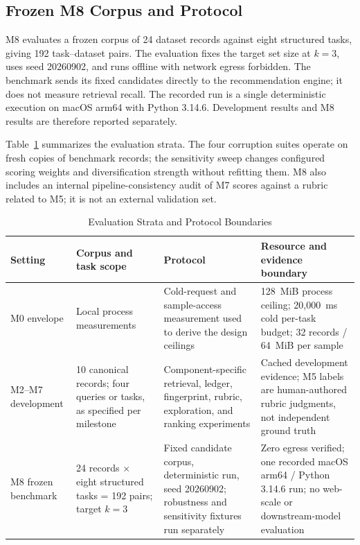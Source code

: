 \documentclass[conference]{IEEEtran}
\begin{document}
\subsection{Frozen M8 Corpus and Protocol}
M8 evaluates a frozen corpus of 24 dataset records against eight structured tasks, giving 192 task--dataset pairs. The evaluation fixes the target set size at $k=3$, uses seed 20260902, and runs offline with network egress forbidden. The benchmark sends its fixed candidates directly to the recommendation engine; it does not measure retrieval recall. The recorded run is a single deterministic execution on macOS arm64 with Python 3.14.6. Development results and M8 results are therefore reported separately.

Table~\ref{tab:eval-protocol} summarizes the evaluation strata. The four corruption suites operate on fresh copies of benchmark records; the sensitivity sweep changes configured scoring weights and diversification strength without refitting them. M8 also includes an internal pipeline-consistency audit of M7 scores against a rubric related to M5; it is not an external validation set.

\begin{table}[t]
\caption{Evaluation Strata and Protocol Boundaries}
\label{tab:eval-protocol}
\centering
\footnotesize
\begin{tabularx}{\textwidth}{p{0.78in}p{1.35in}X p{1.70in}}
\toprule
Setting & Corpus and task scope & Protocol & Resource and evidence boundary \\
\midrule
M0 envelope & Local process measurements & Cold-request and sample-access measurement used to derive the design ceilings & 128~MiB process ceiling; 20{,}000~ms cold per-task budget; 32 records / 64~MiB per sample \\
M2--M7 development & 10 canonical records; four queries or tasks, as specified per milestone & Component-specific retrieval, ledger, fingerprint, rubric, exploration, and ranking experiments & Cached development evidence; M5 labels are human-authored rubric judgments, not independent ground truth \\
M8 frozen benchmark & 24 records $\times$ eight structured tasks = 192 pairs; target $k=3$ & Fixed candidate corpus, deterministic run, seed 20260902; robustness and sensitivity fixtures run separately & Zero egress verified; one recorded macOS arm64 / Python 3.14.6 run; no web-scale or downstream-model evaluation \\
\bottomrule
\end{tabularx}
\end{table}
\end{document}
